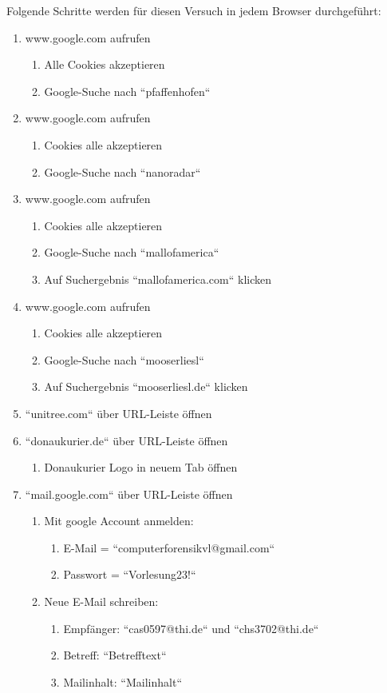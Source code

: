 Folgende Schritte werden für diesen Versuch in jedem Browser durchgeführt: 
\begin{enumerate}
\item  www.google.com aufrufen
	\begin{enumerate}[label*=\arabic*.]
	\item Alle Cookies akzeptieren 
	\item Google-Suche nach ``pfaffenhofen``
	\end{enumerate}
\item www.google.com aufrufen
	\begin{enumerate}[label*=\arabic*.]
	\item Cookies alle akzeptieren 
	\item Google-Suche nach ``nanoradar``
	\end{enumerate}
\item www.google.com aufrufen
	\begin{enumerate}[label*=\arabic*.]
	\item Cookies alle akzeptieren 
	\item Google-Suche nach ``mallofamerica``
	\item Auf Suchergebnis ``mallofamerica.com`` klicken
	\end{enumerate}
\item www.google.com aufrufen
	\begin{enumerate}[label*=\arabic*.]
	\item Cookies alle akzeptieren 
	\item Google-Suche nach ``mooserliesl``
	\item Auf Suchergebnis ``mooserliesl.de`` klicken
	\end{enumerate}
\item ``unitree.com`` über URL-Leiste öffnen
\item ``donaukurier.de`` über URL-Leiste öffnen
	\begin{enumerate}[label*=\arabic*.]
	\item Donaukurier Logo in neuem Tab öffnen
	\end{enumerate}
\item ``mail.google.com`` über URL-Leiste öffnen
	\begin{enumerate}[label*=\arabic*.]
	\item Mit google Account anmelden: 
			\begin{enumerate}[label*=\arabic*.]
			\item E-Mail = ``computerforensikvl@gmail.com``
			\item Passwort = ``Vorlesung23!``
			\end{enumerate}
	\item Neue E-Mail schreiben:
			\begin{enumerate}[label*=\arabic*.]
			\item Empfänger: ``cas0597@thi.de`` und ``chs3702@thi.de``
			\item Betreff: ``Betrefftext``
			\item Mailinhalt: ``Mailinhalt``
			\end{enumerate}			
	\end{enumerate}
\end{enumerate}

